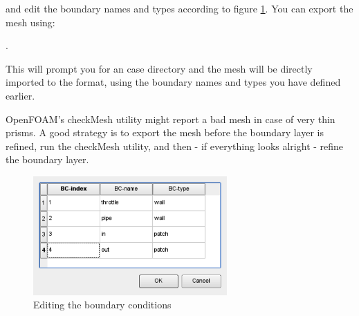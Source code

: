 
and edit the boundary names and types according to figure \ref{fig:T1_scr10}. You can export the mesh using:

.

This will prompt you for an \foam case directory and the mesh will be directly imported to the \foam format, using the boundary names and types you have defined earlier.

\important
{
  OpenFOAM's checkMesh utility might report a bad mesh
  in case of very thin prisms. A good strategy is to export the mesh
  before the boundary layer is refined, run the checkMesh utility, and
  then - if everything looks alright - refine the boundary layer.
}
\begin{figure}
  \begin{centering}
    \includegraphics[width=74mm]{figures/tutorials/T1/scr10}
    \par
  \end{centering}
  \caption{Editing the boundary conditions}
  \label{fig:T1_scr10}
\end{figure}

